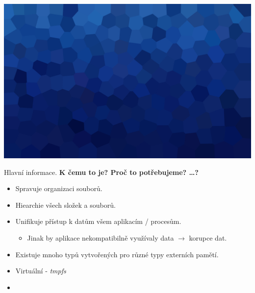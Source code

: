 \documentclass[aspectratio=169,xcolor=dvipsnames, t]{beamer}
\begin{document}
{
{
    \includegraphics[width=\paperwidth,height=\paperheight]{AICStyleData/logos/mene_polygonu_bg.png}
}
\begin{frame}{Hlavní informace.}
    \textbf{\large K čemu to je? Proč to potřebujeme? \dots ?}
        \begin{itemize}
            \item Spravuje organizaci souborů.
            \item Hiearchie všech složek a souborů.
            \item Unifikuje přístup k datům všem aplikacím / procesům.
            \begin{itemize}
                \item Jinak by aplikace nekompatibilně využívaly data $\rightarrow$ korupce dat.
            \end{itemize}
            \item Existuje mnoho typů vytvořených pro různé typy externích pamětí.
            \item Virtuální - \emph{tmpfs}
            \item 
        \end{itemize}
\end{frame}
}
\end{document}

